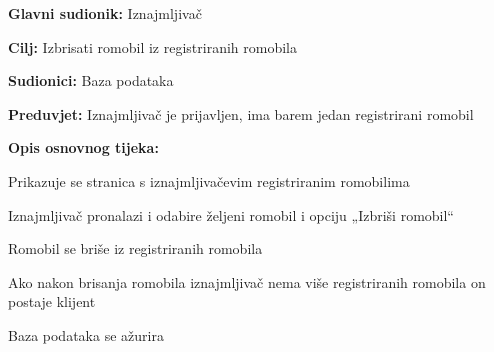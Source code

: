 						\noindent {}
						\begin{packed_item}
							
							\item \textbf{Glavni sudionik: }Iznajmljivač
							\item  \textbf{Cilj: }Izbrisati romobil iz registriranih romobila
							\item  \textbf{Sudionici:} Baza podataka
							\item  \textbf{Preduvjet:} Iznajmljivač je prijavljen, ima barem jedan registrirani romobil
							\item  \textbf{Opis osnovnog tijeka:}
							
							\item[] \begin{packed_enum}
								
								\item Prikazuje se stranica s iznajmljivačevim registriranim romobilima
								\item Iznajmljivač pronalazi i odabire željeni romobil i opciju „Izbriši romobil“
								\item Romobil se briše iz registriranih romobila 
								\item Ako nakon brisanja romobila iznajmljivač nema više registriranih romobila on postaje klijent
								\item Baza podataka se ažurira
								   
							\end{packed_enum}
							
						\end{packed_item}
						\noindent {}
